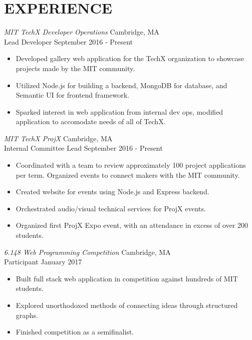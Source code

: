 \documentclass[8pt]{res}
\begin{document}
\section{EXPERIENCE}
  {\sl MIT TechX Developer Operations}                       \hfill  Cambridge, MA\\
  Lead Developer                                             \hfill  September 2016 - Present 
    \begin{itemize}  %
      \item Developed gallery web application for the TechX organization to showcase projects made by the MIT community. 
      \item Utilized Node.js for building a backend, MongoDB for database, and Semantic UI for frontend framework.
      \item Sparked interest in web application from internal dev ops, modified application to accomodate needs of all of TechX.
    \end{itemize} 
  {\sl MIT TechX ProjX}                                      \hfill  Cambridge, MA\\
  Internal Committee Lead                                    \hfill  September 2016 - Present 
    \begin{itemize}  %
      \item Coordinated with a team to review approximately 100 project applications per term. Organized events to connect makers with the MIT community.
      \item Created website for events using Node.js and Express backend.
      \item Orchestrated audio/visual technical services for ProjX events.
      \item Organized first ProjX Expo event, with an attendance in excess of over 200 students.
    \end{itemize}
  {\sl 6.148 Web Programming Competition}                    \hfill  Cambridge, MA\\
  Participant                                                \hfill  January 2017 
    \begin{itemize}
      \item Built full stack web application in competition against hundreds of MIT students.
      \item Explored unorthodoxed methods of connecting ideas through structured graphs.
      \item Finished competition as a semifinalist.
    \end{itemize}
\end{document}
